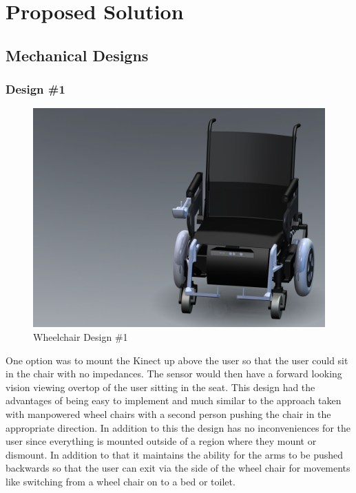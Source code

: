 \documentclass[oneside,final,a4paper]{report}
\begin{document}
\chapter{Proposed Solution}

\section{Mechanical Designs}
\subsection{Design \#1}
\begin{figure}[hbt]
 \centering
 \includegraphics[scale=0.15]{WheelChair_1}
 \caption{Wheelchair Design \#1}
\end{figure}

One option was to mount the Kinect up above the user so that the user could sit in the chair with no impedances. The sensor would then have a forward looking vision viewing overtop of the user sitting in the seat. This design had the advantages of being easy to implement and much similar to the approach taken with manpowered wheel chairs with a second person pushing the chair in the appropriate direction. In addition to this the design has no inconveniences for the user since everything is mounted outside of a region where they mount or dismount. In addition to that it maintains the ability for the arms to be pushed backwards so that the user can exit via the side of the wheel chair for movements like switching from a wheel chair on to a bed or toilet.
\end{document}
